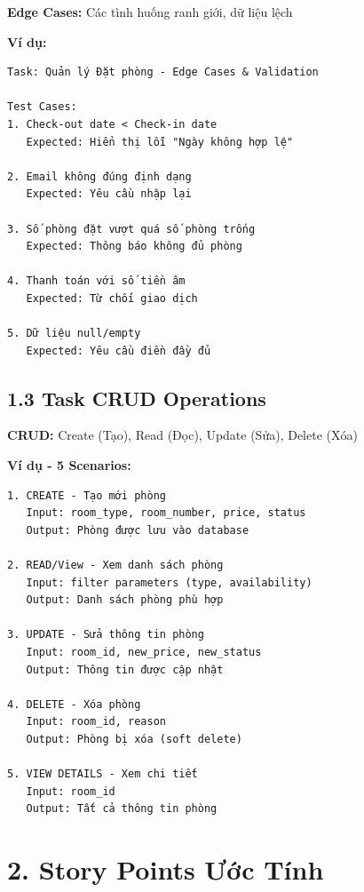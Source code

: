 \documentclass[12pt, a4paper]{report}
\begin{document}
\begin{tcolorbox}[colback=orange!5]
\textbf{Edge Cases:} Các tình huống ranh giới, dữ liệu lệch

\textbf{Ví dụ:}
\begin{lstlisting}
Task: Quản lý Đặt phòng - Edge Cases & Validation

Test Cases:
1. Check-out date < Check-in date
   Expected: Hiển thị lỗi "Ngày không hợp lệ"

2. Email không đúng định dạng
   Expected: Yêu cầu nhập lại

3. Số phòng đặt vượt quá số phòng trống
   Expected: Thông báo không đủ phòng

4. Thanh toán với số tiền âm
   Expected: Từ chối giao dịch

5. Dữ liệu null/empty
   Expected: Yêu cầu điền đầy đủ
\end{lstlisting}
\end{tcolorbox}

\subsection{1.3 Task CRUD Operations}

\begin{tcolorbox}[colback=blue!5]
\textbf{CRUD:} Create (Tạo), Read (Đọc), Update (Sửa), Delete (Xóa)

\textbf{Ví dụ - 5 Scenarios:}
\begin{lstlisting}
1. CREATE - Tạo mới phòng
   Input: room_type, room_number, price, status
   Output: Phòng được lưu vào database

2. READ/View - Xem danh sách phòng
   Input: filter parameters (type, availability)
   Output: Danh sách phòng phù hợp

3. UPDATE - Sửa thông tin phòng
   Input: room_id, new_price, new_status
   Output: Thông tin được cập nhật

4. DELETE - Xóa phòng
   Input: room_id, reason
   Output: Phòng bị xóa (soft delete)

5. VIEW DETAILS - Xem chi tiết
   Input: room_id
   Output: Tất cả thông tin phòng
\end{lstlisting}
\end{tcolorbox}

\section{2. Story Points Ước Tính}
\end{document}
